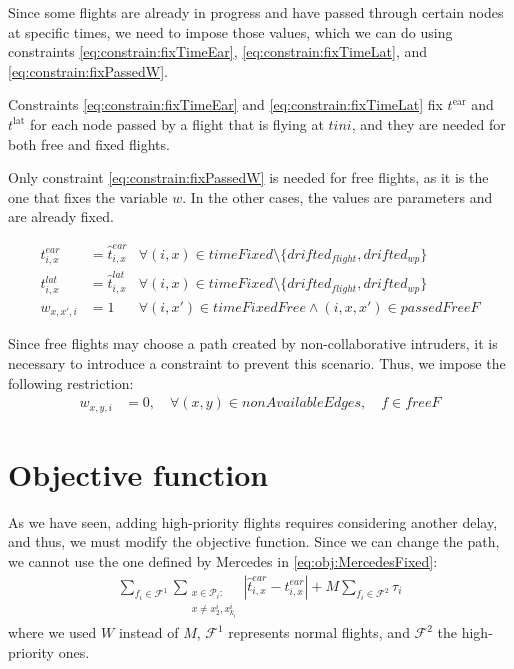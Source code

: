 \documentclass[../thesis.tex]{subfiles}
\begin{document}
Since some flights are already in progress and have passed through certain nodes at specific times, we need to impose those values, which we can do using constraints \ref{eq:constrain:fixTimeEar}, \ref{eq:constrain:fixTimeLat}, and \ref{eq:constrain:fixPassedW}.  

Constraints \ref{eq:constrain:fixTimeEar} and \ref{eq:constrain:fixTimeLat} fix $t^\text{ear}$ and $t^\text{lat}$ for each node passed by a flight that is flying at $tini$, and they are needed for both free and fixed flights.  

Only constraint \ref{eq:constrain:fixPassedW} is needed for free flights, as it is the one that fixes the variable $w$. In the other cases, the values are parameters and are already fixed.  

\begin{align}
t^{ear}_{i,x} &= \hat{t}^{ear}_{i,x} & \forall (i,x) \in timeFixed\setminus\{drifted_{flight},drifted_{wp}\}
\label{eq:constrain:fixTimeEar}\\
t^{lat}_{i,x} &= \hat{t}^{lat}_{i,x} & \forall (i,x) \in timeFixed\setminus\{drifted_{flight},drifted_{wp}\}
\label{eq:constrain:fixTimeLat}\\
w_{x,x',i} &= 1 & \forall (i,x') \in timeFixedFree \land (i,x,x')\in passedFreeF
\label{eq:constrain:fixPassedW}
\end{align}

Since free flights may choose a path created by non-collaborative intruders, it is necessary to introduce a constraint to prevent this scenario.  
Thus, we impose the following restriction:
\begin{align}
    w_{x,y,i} & = 0, \quad \forall (x,y) \in nonAvailableEdges, \quad f \in freeF
    \label{eq:constrain:avoidShortcut}
\end{align}


\section{Objective function}
As we have seen, adding high-priority flights requires considering another delay, and thus, we must modify the objective function.  
Since we can change the path, we cannot use the one defined by Mercedes in \eqref{eq:obj:MercedesFixed}:  
\begin{align}\label{eq:obj:MercedesFixed}
\sum_{f_i \in \mathcal{F}^1} \sum_{\substack{x\in \mathcal{P}_i:\\ x\neq x^i_2,x_{k_i}^i }} |\hat{t}^{ear}_{i,x}-t^{ear}_{i,x}|
+ M\sum_{f_i\in \mathcal{F}^2}\tau_i
\end{align}
where we used $W$ instead of $M$, $\mathcal{F}^1$ represents normal flights, and $\mathcal{F}^2$ the high-priority ones.  
\end{document}
